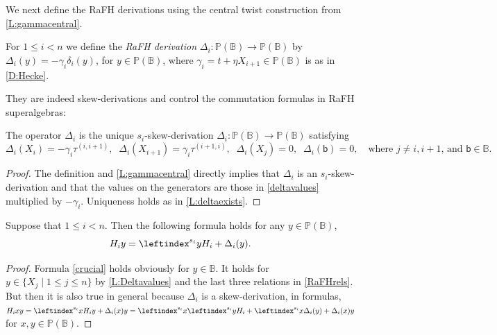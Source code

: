 \documentclass[a4paper,11pt]{amsart}
\numberwithin{equation}{subsection}
\theoremstyle{definition}
\theoremstyle{theorem}
\theoremstyle{remark}
\newcommand\bb{\mathsf{b}}
\newcommand\Po{\mathbb{P}(\mathbb{B})}
\newcommand{\Bo}{\mathbb{B}}
\begin{document}
We next define the RaFH derivations using the central twist construction from \autoref{L:gammacentral}.

\begin{Definition}\label{D:RaFHDer}
  For $1\le i<n$ we define the \emph{RaFH derivation}
  $\Delta_i\colon\Po\to\Po$ by
  $\Delta_i(y)=-\gamma_i\delta_i(y)$, for $y\in\Po$,
  where $\gamma_i=t+\eta X_{i+1}\in\Po$ is
  as in \autoref{D:Hecke}.
\end{Definition}

They are indeed skew-derivations and control the commutation formulas in RaFH superalgebras:
\begin{Lemma}\label{L:Deltavalues}
  The operator $\Delta_i$ is the unique $s_i$-skew-derivation
  $\Delta_i\colon\Po\to\Po$ satisfying
  \begin{equation*}
    \Delta_i(X_i)=-\gamma_i\tau^{(i,i+1)},\;\;
    \Delta_i(X_{i+1})=\gamma_i\tau^{(i+1,i)},\;\;
    \Delta_i(X_j)=0,\;\;
    \Delta_i(\bb)=0,
    \quad\text{where $j\not=i,i+1$, and $\bb\in\Bo$.}
  \end{equation*}
\end{Lemma}

\begin{proof} The definition and \autoref{L:gammacentral} directly implies that $\Delta_i$ is an $s_i$-skew-derivation and that the values on the
  generators are those in \autoref{deltavalues} multiplied by $-\gamma_i$.
  Uniqueness holds as in \autoref{L:deltaexists}.
\end{proof}


 \begin{Proposition}\label{L:crucial}
    Suppose that $1\le i<n$. Then the following formula holds for any $y\in\Po$,
    \begin{equation}\label{crucial}
     H_iy=\leftindex^{s_i}yH_i+\Delta_i(y).
    \end{equation}
\end{Proposition}
\begin{proof} Formula \autoref{crucial} holds obviously for $y\in\Bo$. It holds for
$y\in\{X_j\mid 1\leq j\leq n\}$ by \autoref{L:Deltavalues} and  the last
three relations in \autoref{RaFHrels}. But then it is also true in general because $\Delta_i$ is a skew-derivation, in formulas,
$H_ixy=\leftindex^{s_i}xH_i y + \Delta_i(x)y=\leftindex^{s_i}x\leftindex^{s_i}yH_i
+\leftindex^{s_i}x\Delta_i(y)+\Delta_i(x)y$ for $x,y\in\Po$.
\end{proof}
\end{document}
